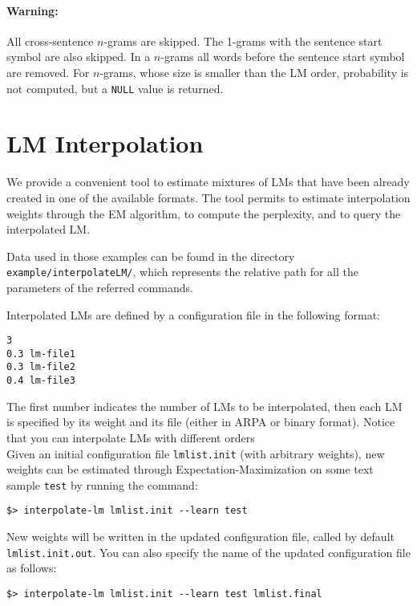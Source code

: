 \documentclass[11pt]{article}
\begin{document}
\paragraph{Warning:} All cross-sentence $n$-grams are skipped. The 1-grams with the sentence start symbol are also skipped. In a $n$-grams all words before the sentence start symbol are removed. For $n$-grams, whose size is smaller than the LM order, probability is not computed, but a {\tt NULL} value is returned.


\newpage
\section{LM Interpolation}
We provide a convenient tool to estimate mixtures of LMs that have been already 
created in one of the available formats.  The tool permits to estimate interpolation
weights through the EM algorithm, to compute the perplexity, and to query the interpolated
LM. 

\noindent
Data used in those examples can be found in the directory {\tt example/interpolateLM/},
which represents the relative path for all the parameters of the referred commands.

\noindent
Interpolated LMs are defined by a configuration file in the following format:
\begin{verbatim}
3
0.3 lm-file1
0.3 lm-file2
0.4 lm-file3
\end{verbatim}

\noindent
The first number indicates the number of LMs to be interpolated, then each LM is specified
by its weight and its file (either in ARPA or binary format). Notice that you can interpolate
LMs with different orders\\

\noindent
Given an initial configuration file {\tt lmlist.init} (with arbitrary weights), new weights can be estimated
through Expectation-Maximization on some text sample {\tt test} by running the command:
\begin{verbatim}
$> interpolate-lm lmlist.init --learn test
\end{verbatim}
\noindent
New weights will be written in the updated configuration file, called by default {\tt lmlist.init.out}.
You can also specify the name of the updated configuration file as follows:

\begin{verbatim}
$> interpolate-lm lmlist.init --learn test lmlist.final
\end{verbatim}
\end{document}
